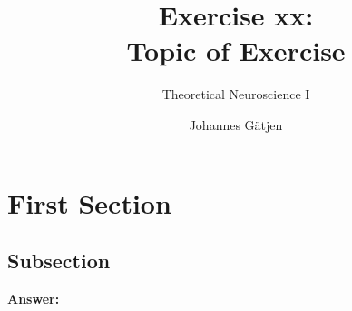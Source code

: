 \documentclass{scrartcl}
\title{Exercise xx:\\Topic of Exercise}
\subtitle{Theoretical Neuroscience I}
\author{Johannes G\"atjen}
\newcommand\Answer{%
  \textbf{Answer:}\\%
}
\begin{document}
\maketitle
\section{First Section}
\subsection{Subsection}
\Answer
\end{document}
